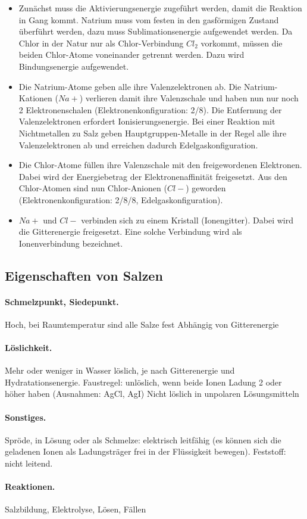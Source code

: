 \begin{itemize}
	 \item Zunächst muss die Aktivierungsenergie zugeführt werden, damit die Reaktion in
	 Gang kommt. Natrium muss vom festen in den gasförmigen Zustand überführt werden,
	 dazu muss Sublimationsenergie aufgewendet werden. Da Chlor in der Natur nur
	 als Chlor-Verbindung $Cl_2$ vorkommt, müssen die beiden Chlor-Atome voneinander
	 getrennt werden. Dazu wird Bindungsenergie aufgewendet.
	 \item Die Natrium-Atome geben alle ihre Valenzelektronen ab. Die Natrium-Kationen
	 ($N a+$) verlieren damit ihre Valenzschale und haben nun nur noch 2 Elektronenschalen
	 (Elektronenkonfiguration: 2/8). Die Entfernung der Valenzelektronen erfordert
	 Ionisierungsenergie. Bei einer Reaktion mit Nichtmetallen zu Salz geben
	 Hauptgruppen-Metalle in der Regel alle ihre Valenzelektronen ab und erreichen dadurch
	 Edelgaskonfiguration.
	 \item Die Chlor-Atome füllen ihre Valenzschale mit den freigewordenen Elektronen. Dabei
	 wird der Energiebetrag der Elektronenaffinität freigesetzt. Aus den Chlor-Atomen
	 sind nun Chlor-Anionen ($Cl-$) geworden (Elektronenkonfiguration: 2/8/8, Edelgaskonfiguration).
	 \item $N a+$ und $Cl-$ verbinden sich zu einem Kristall (Ionengitter). Dabei wird die Gitterenergie
	 freigesetzt. Eine solche Verbindung wird als Ionenverbindung bezeichnet.
\end{itemize}

\subsection{Eigenschaften von Salzen}

\paragraph{Schmelzpunkt, Siedepunkt.}

Hoch, bei Raumtemperatur sind alle Salze fest Abhängig von Gitterenergie

\paragraph{Löslichkeit.}

Mehr oder weniger in Wasser löslich, je nach Gitterenergie und Hydratationsenergie. Faustregel: unlöslich, wenn beide Ionen Ladung 2 oder höher haben (Ausnahmen: AgCl, AgI) Nicht löslich in unpolaren Lösungsmitteln

\paragraph{Sonstiges.}

Spröde, in Lösung oder als Schmelze: elektrisch leitfähig (es können sich die geladenen Ionen als Ladungsträger frei in der Flüssigkeit
bewegen). Feststoff: nicht leitend.

\paragraph{Reaktionen.}

Salzbildung, Elektrolyse, Lösen, Fällen